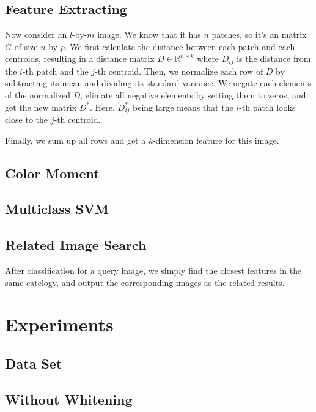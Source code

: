 \documentclass{acm_proc_article-sp}
\begin{document}

\subsection{Feature Extracting}

Now consider an $l$-by-$m$ image.
We know that it has $n$ patches, so it's an matrix $G$ of size $n$-by-$p$.
We first calculate the distance between each patch
and each centroids, resulting in a distance matrix $D\in\mathbb{R}^{n\times k}$
where $D_{ij}$ is the distance from the $i$-th patch
and the $j$-th centroid.
Then, we normalize each row of $D$ by
    subtracting its mean and dividing its standard variance.
We negate each elements of the normalized $D$, elimate
    all negative elements by setting them to zeros,
    and get the new matrix $D^*$.
Here, $D^*_{ij}$ being large means that the $i$-th patch
    looks close to the $j$-th centroid.

Finally, we sum up all rows and get a $k$-dimension feature for this image.

\subsection{Color Moment}

\subsection{Multiclass SVM}

\subsection{Related Image Search}

After classification for a query image,
    we simply find the closest features in the same catelogy,
    and output the corresponding images as the related results.

\section{Experiments}

\subsection{Data Set}

\subsection{Without Whitening}
\end{document}
